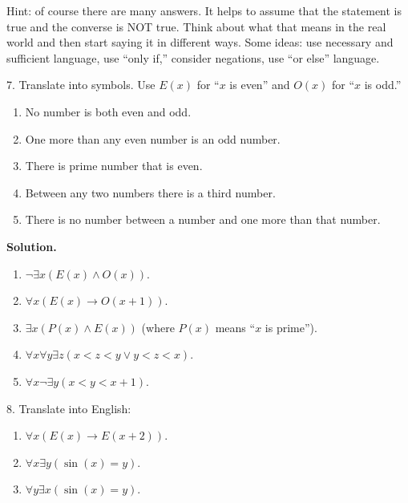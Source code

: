 \documentclass[10pt,]{book}
\theoremstyle{plain}
\theoremstyle{definition}
\theoremstyle{definition}
\theoremstyle{definition}
\numberwithin{equation}{section}
\def\imp{\rightarrow}
\newcommand{\lt}{ < }
\begin{document}
\begin{exerciselist}
          Hint: of course there are many answers. It helps to assume that the statement is true and the converse is NOT true. Think about what that means in the real world and then start saying it in different ways. Some ideas: use necessary and sufficient language, use ``only if,'' consider negations, use ``or else'' language.
\item[7.]\hypertarget{exercise-7}{}
          Translate into symbols. Use \(E(x)\) for ``\(x\) is even'' and \(O(x)\) for ``\(x\) is odd.''
\leavevmode%
\begin{enumerate}[label=(\alph*)]
\item\hypertarget{li-127}{} No number is both even and odd. %
\item\hypertarget{li-128}{} One more than any even number is an odd number. %
\item\hypertarget{li-129}{} There is prime number that is even. %
\item\hypertarget{li-130}{} Between any two numbers there is a third number. %
\item\hypertarget{li-131}{} There is no number between a number and one more than that number. %
\end{enumerate}
\par\smallskip
\par\smallskip
\noindent\textbf{Solution.}\hypertarget{solution-13}{}\quad
\leavevmode%
\begin{enumerate}[label=(\alph*)]
\item\hypertarget{li-132}{}\(\neg \exists x (E(x) \wedge O(x))\).%
\item\hypertarget{li-133}{}\(\forall x (E(x) \imp O(x+1))\).%
\item\hypertarget{li-134}{}\(\exists x(P(x) \wedge E(x))\) (where \(P(x)\) means ``\(x\) is prime'').%
\item\hypertarget{li-135}{}\(\forall x \forall y \exists z(x \lt  z \lt  y \vee y \lt  z \lt  x)\).%
\item\hypertarget{li-136}{}\(\forall x \neg \exists y (x \lt  y \lt  x+1)\).%
\end{enumerate}
\item[8.]\hypertarget{exercise-8}{}
          Translate into English:
\leavevmode%
\begin{enumerate}[label=(\alph*)]
\item\hypertarget{li-137}{}\(\forall x (E(x) \imp E(x +2))\).%
\item\hypertarget{li-138}{}\(\forall x \exists y (\sin(x) = y)\).%
\item\hypertarget{li-139}{}\(\forall y \exists x (\sin(x) = y)\).%

\end{enumerate}
\end{exerciselist}
\end{document}

